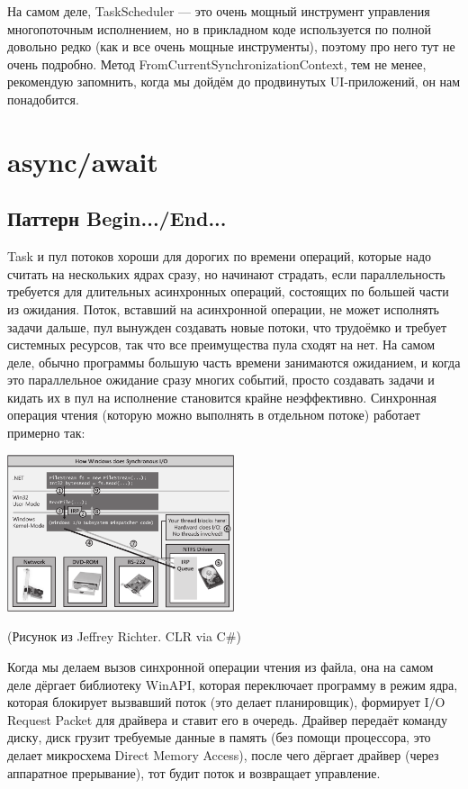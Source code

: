 \documentclass[a5paper]{article}
\begin{document}
На самом деле, TaskScheduler --- это очень мощный инструмент управления многопоточным исполнением, но в прикладном коде используется по полной довольно редко (как и все очень мощные инструменты), поэтому про него тут не очень подробно. Метод FromCurrentSynchronizationContext, тем не менее, рекомендую запомнить, когда мы дойдём до продвинутых UI-приложений, он нам понадобится.

\section{async/await}

\subsection{Паттерн Begin.../End...}

Task и пул потоков хороши для дорогих по времени операций, которые надо считать на нескольких ядрах сразу, но начинают страдать, если параллельность требуется для длительных асинхронных операций, состоящих по большей части из ожидания. Поток, вставший на асинхронной операции, не может исполнять задачи дальше, пул вынужден создавать новые потоки, что трудоёмко и требует системных ресурсов, так что все преимущества пула сходят на нет. На самом деле, обычно программы большую часть времени занимаются ожиданием, и когда это параллельное ожидание сразу многих событий, просто создавать задачи и кидать их в пул на исполнение становится крайне неэффективно. Синхронная операция чтения (которую можно выполнять в отдельном потоке) работает примерно так:

\begin{center}
    \includegraphics[width=0.5\textwidth]{windowsSynchronousIO.png}

    \begin{footnotesize}(Рисунок из Jeffrey Richter. CLR via C\#)\end{footnotesize}
\end{center}

Когда мы делаем вызов синхронной операции чтения из файла, она на самом деле дёргает библиотеку WinAPI, которая переключает программу в режим ядра, которая блокирует вызвавший поток (это делает планировщик), формирует I/O Request Packet для драйвера и ставит его в очередь. Драйвер передаёт команду диску, диск грузит требуемые данные в память (без помощи процессора, это делает микросхема Direct Memory Access), после чего дёргает драйвер (через аппаратное прерывание), тот будит поток и возвращает управление.
\end{document}
